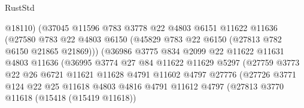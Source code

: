 \begin{lexlean}{RustStd}
\begin{coremodule}
                                  @18110)
                                (@37045
                                  @11596
                                  @783
                                  @3778
                                  @22
                                  @4803
                                  @6151
                                  @11622
                                  @11636
                                  (@27580
                                    @783
                                    @22
                                    @4803
                                    @6150
                                    (@45829 @783 @22 @6150 (@27813 @782 @6150 @21865 @21869)))
                                  (@36986
                                    @3775
                                    @834
                                    @2099
                                    @22
                                    @11622
                                    @11631
                                    @4803
                                    @11636
                                    (@36995
                                      @3774
                                      @27
                                      @84
                                      @11622
                                      @11629
                                      @5297
                                      (@27759
                                        @3773
                                        @22
                                        @26
                                        @6721
                                        @11621
                                        @11628
                                        @4791
                                        @11602
                                        @4797
                                        @27776
                                        (@27726
                                          @3771
                                          @124
                                          @22
                                          @25
                                          @11618
                                          @4803
                                          @4816
                                          @4791
                                          @11612
                                          @4797
                                          (@27813
                                            @3770
                                            @11618
                                            (@15418 (@15419 @11618))

\end{coremodule}
\end{lexlean}
